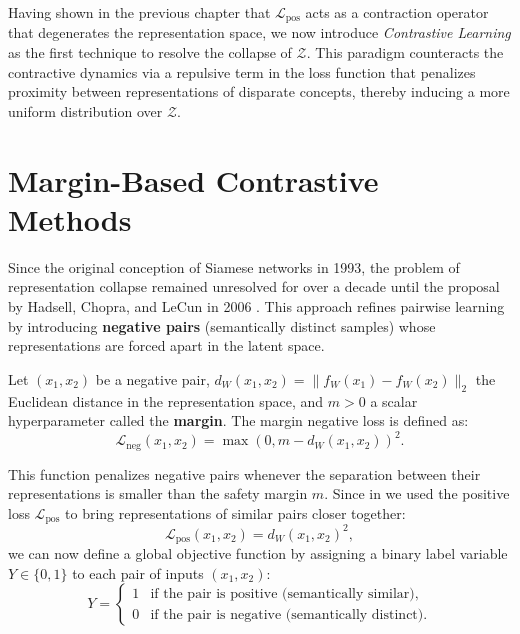 \documentclass[11pt, oneside, openany]{book}
\begin{document}
Having shown in the previous chapter that $\mathcal{L}_{\text{pos}}$ acts as a contraction operator that degenerates the representation space, we now introduce \textit{Contrastive Learning} as the first technique to resolve the collapse of $\mathcal{Z}$. This paradigm counteracts the contractive dynamics via a repulsive term in the loss function that penalizes proximity between representations of disparate concepts, thereby inducing a more uniform distribution over $\mathcal{Z}$.

\section{Margin-Based Contrastive Methods}
\label{sec:4.1}

Since the original conception of Siamese networks in 1993, the problem of representation collapse remained unresolved for over a decade until the proposal by Hadsell, Chopra, and LeCun in 2006 \cite{hadsell2006dimensionality}. This approach refines pairwise learning by introducing \textbf{negative pairs} (semantically distinct samples) whose representations are forced apart in the latent space.

\begin{definition}
\label{def:4.1}
Let $(x_{1}, x_{2})$ be a negative pair, $d_{W}(x_{1}, x_{2}) = \lVert f_{W}(x_{1}) - f_{W}(x_{2}) \rVert_{2}$ the Euclidean distance in the representation space, and $m > 0$ a scalar hyperparameter called the \textbf{margin}. The margin negative loss is defined as:
\begin{equation}
\label{eq:4.1}
\mathcal{L}_{\text{neg}}(x_{1}, x_{2}) = \max\left(0, m - d_{W}(x_{1}, x_{2})\right)^{2}.
\end{equation}
\end{definition}

This function penalizes negative pairs whenever the separation between their representations is smaller than the safety margin $m$. Since in  we used the positive loss $\mathcal{L}_{\text{pos}}$ to bring representations of similar pairs closer together:
\begin{equation}
\label{eq:4.2}
\mathcal{L}_{\text{pos}}(x_{1}, x_{2}) = d_{W}(x_{1}, x_{2})^{2},
\end{equation}
we can now define a global objective function by assigning a binary label variable $Y \in \{0, 1\}$ to each pair of inputs $(x_{1}, x_{2})$:
\begin{equation}
\label{eq:4.3}
Y = 
\begin{cases}
1 & \text{if the pair is positive (semantically similar)}, \\
0 & \text{if the pair is negative (semantically distinct)}.
\end{cases}
\end{equation}
\end{document}
